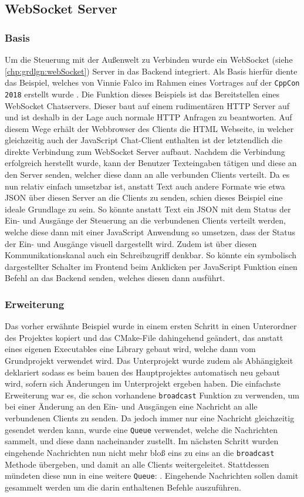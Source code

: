 \subsection{WebSocket Server}\label{chp:ums:websockserver}
\subsubsection{Basis}
Um die Steuerung mit der Außenwelt zu Verbinden wurde ein WebSocket (siehe \ref{chp:grdlgn:webSocket}) Server in das Backend integriert. Als Basis hierfür diente das Beispiel, welches von Vinnie Falco im  Rahmen eines Vortrages auf der \texttt{CppCon 2018} erstellt wurde \cite{URL:WebSocketCppCon}. Die Funktion dieses Beispiels ist das Bereitstellen  eines WebSocket Chatservers. Dieser baut auf einem rudimentären HTTP Server auf und ist deshalb in der Lage auch normale HTTP Anfragen zu beantworten. Auf diesem Wege erhält der Webbrowser des Clients die HTML Webseite, in welcher gleichzeitig auch der JavaScript Chat-Client enthalten ist der letztendlich die direkte Verbindung zum WebSocket Server aufbaut. Nachdem die Verbindung erfolgreich herstellt wurde, kann der Benutzer Texteingaben tätigen und diese an den Server senden, welcher diese dann an alle verbunden Clients verteilt. Da es nun relativ einfach umsetzbar ist, anstatt Text auch andere Formate wie etwa JSON über diesen Server an die Clients zu senden, schien dieses Beispiel eine ideale Grundlage zu sein. So könnte anstatt Text ein JSON mit dem Status der Ein- und Ausgänge der Steuerung an die verbundenen Clients verteilt werden, welche diese dann mit einer JavaScript Anwendung so umsetzen, dass der Status der Ein- und Ausgänge visuell dargestellt wird. Zudem ist über diesen Kommunikationskanal auch ein Schreibzugriff denkbar. So könnte ein symbolisch dargestellter Schalter im Frontend beim Anklicken per JavaScript Funktion einen Befehl an das Backend senden, welches diesen dann ausführt. 
\subsubsection{Erweiterung}
Das vorher erwähnte Beispiel wurde in einem ersten Schritt in einen Unterordner des Projektes kopiert und das CMake-File dahingehend geändert, das anstatt eines eigenen Executables eine Library gebaut wird, welche dann vom Grundprojekt verwendet wird. Das Unterprojekt wurde zudem als Abhängigkeit deklariert sodass es beim bauen des Hauptprojektes automatisch neu gebaut wird, sofern sich Änderungen im Unterprojekt ergeben haben. Die einfachste Erweiterung war es, die schon vorhandene \texttt{broadcast} Funktion zu verwenden, um bei einer Änderung an den Ein- und Ausgängen eine Nachricht an alle verbundenen Clients zu senden. Da jedoch immer nur eine Nachricht gleichzeitig gesendet werden kann, wurde eine \texttt{Queue} verwendet, welche die Nachrichten sammelt, und diese dann  nacheinander zustellt. Im nächsten Schritt wurden eingehende Nachrichten nun nicht mehr bloß eins zu eins an die \texttt{broadcast} Methode übergeben, und damit an alle Clients weitergeleitet. Stattdessen mündeten diese nun in eine weitere \texttt{Queue}: . Eingehende Nachrichten sollen damit gesammelt werden um die darin enthaltenen Befehle auszuführen.

